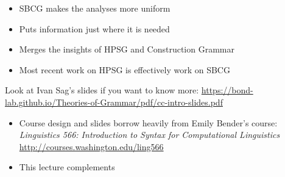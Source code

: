 \documentclass[a4paper,landscape,headrule,footrule]{foils}
\begin{document}



\begin{itemize}
\item SBCG makes the analyses more uniform
\item Puts information just where it is needed
\item Merges the insights of HPSG and Construction Grammar
\item Most recent work on HPSG is effectively work on SBCG
\end{itemize}

Look at Ivan Sag's slides if you want to know more:
\url{https://bond-lab.github.io/Theories-of-Grammar/pdf/cc-intro-slides.pdf}
    


\begin{itemize}
\item Course design and slides borrow heavily from Emily Bender's course:
\textit{Linguistics 566: Introduction to Syntax for Computational Linguistics}
\\ \url{http://courses.washington.edu/ling566}
\item This lecture complements \citet[Chapter 16]{sag:wasow:bender:2003}
\end{itemize}


\end{document}

